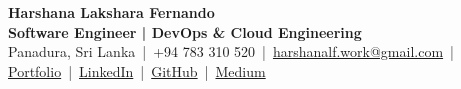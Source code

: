 \begin{center} 
    {\fontsize{20}{24}\bfseries Harshana Lakshara Fernando}\\[3pt] 
    \textbf{Software Engineer | DevOps \& Cloud Engineering}\\[3pt]
    \small 
    Panadura, Sri Lanka \,|\, +94 783 310 520 \,|\,  
    \href{mailto:harshanalf.work@gmail.com}{harshanalf.work@gmail.com} \,|\,  
    \href{https://harshanalf.netlify.app/portfolio}{Portfolio} \,|\,  
    \href{https://www.linkedin.com/in/harshana-lakshara/}{LinkedIn} \,|\,  
    \href{https://github.com/UchihaIthachi}{GitHub} \,|\,  
    \href{https://medium.com/@HarshanaLF}{Medium} 
\end{center} 
\vspace{-0.6em}
